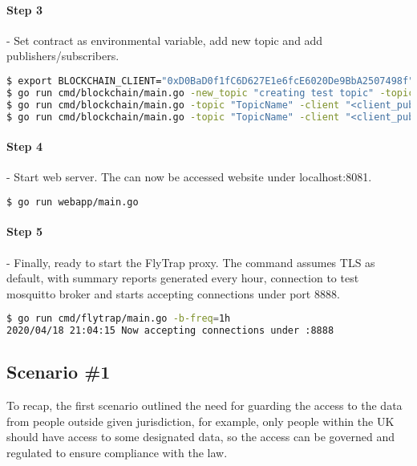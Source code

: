 \paragraph{Step 3} - Set contract as environmental variable, add new topic and add publishers/subscribers.
\begin{lstlisting}[language=bash,breaklines=true]
$ export BLOCKCHAIN_CLIENT="0xD0BaD0f1fC6D627E1e6fcE6020De9BbA2507498f"
$ go run cmd/blockchain/main.go -new_topic "creating test topic" -topic "TopicName"
$ go run cmd/blockchain/main.go -topic "TopicName" -client "<client_pubkey>" -pub "adding test publisher"
$ go run cmd/blockchain/main.go -topic "TopicName" -client "<client_pubkey>" -sub "adding test subscriber"
\end{lstlisting}
\paragraph{Step 4} - Start web server. The can now be accessed website under localhost:8081.
\begin{lstlisting}[language=bash,breaklines=true]
$ go run webapp/main.go
\end{lstlisting}
\paragraph{Step 5} - Finally, ready to start the FlyTrap proxy. The command assumes TLS as default, with summary reports generated every hour, connection to test mosquitto broker and starts accepting connections under port 8888.
\begin{lstlisting}[language=bash,breaklines=true]
$ go run cmd/flytrap/main.go -b-freq=1h
2020/04/18 21:04:15 Now accepting connections under :8888
\end{lstlisting}
\subsection{Scenario \#1}
To recap, the first scenario outlined the need for guarding the access to the data from people outside given jurisdiction, for example, only people within the UK should have access to some designated data, so the access can be governed and regulated to ensure compliance with the law.

